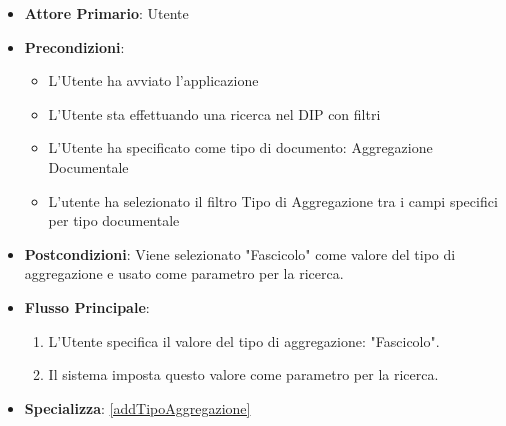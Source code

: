 \begin{itemize}
      \item \textbf{Attore Primario}: Utente
      \item \textbf{Precondizioni}: 
      \begin{itemize}
            \item L'Utente ha avviato l'applicazione
            \item L'Utente sta effettuando una ricerca nel DIP con filtri
            \item L'Utente ha specificato come tipo di documento: Aggregazione Documentale
            \item L'utente ha selezionato il filtro Tipo di Aggregazione tra i campi specifici per tipo documentale
      \end{itemize}
      \item \textbf{Postcondizioni}: Viene selezionato "Fascicolo" come valore del tipo di aggregazione e usato come parametro per la ricerca.
      \item \textbf{Flusso Principale}:
      \begin{enumerate}
            \item L'Utente specifica il valore del tipo di aggregazione: "Fascicolo".
            \item Il sistema imposta questo valore come parametro per la ricerca.
      \end{enumerate}
      \item \textbf{Specializza}: \ref{addTipoAggregazione}
\end{itemize}

